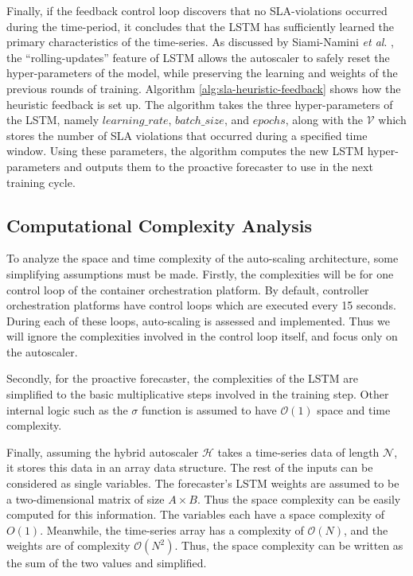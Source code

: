 Finally, if the feedback control loop discovers that no SLA-violations occurred during the time-period, it concludes that the LSTM has sufficiently learned the primary characteristics of the time-series. As discussed by Siami-Namini \textit{et al}. \cite{siami2018comparison}, the ``rolling-updates'' feature of LSTM allows the autoscaler to safely reset the hyper-parameters of the model, while preserving the learning and weights of the previous rounds of training. Algorithm \ref{alg:sla-heuristic-feedback} shows how the heuristic feedback is set up. The algorithm takes the three hyper-parameters of the LSTM, namely $learning\_rate$, $batch\_size$, and $epochs$, along with the $\mathcal{V}$ which stores the number of SLA violations that occurred during a specified time window. Using these parameters, the algorithm computes the new LSTM hyper-parameters and outputs them to the proactive forecaster to use in the next training cycle.\par

\subsection{Computational Complexity Analysis}
\label{subsec:ch4-space-time-comp}

To analyze the space and time complexity of the auto-scaling architecture, some simplifying assumptions must be made. Firstly, the complexities will be for one control loop of the container orchestration platform. By default, controller orchestration platforms have control loops which are executed every 15 seconds. During each of these loops, auto-scaling is assessed and implemented. Thus we will ignore the complexities involved in the control loop itself, and focus only on the autoscaler.\par

Secondly, for the proactive forecaster, the complexities of the LSTM are simplified to the basic multiplicative steps involved in the training step. Other internal logic such as the $\sigma$ function is assumed to have $\mathcal{O}(1)$ space and time complexity.\par

Finally, assuming the hybrid autoscaler $\mathcal{H}$ takes a time-series data of length $\mathcal{N}$, it stores this data in an array data structure. The rest of the inputs can be considered as single variables. The forecaster's LSTM weights are assumed to be a two-dimensional matrix of size $A \times B$. Thus the space complexity can be easily computed for this information. The variables each have a space complexity of $O(1)$. Meanwhile, the time-series array has a complexity of $\mathcal{O}(N)$, and the weights are of complexity $\mathcal{O}(N^2)$. Thus, the space complexity can be written as the sum of the two values and simplified.

